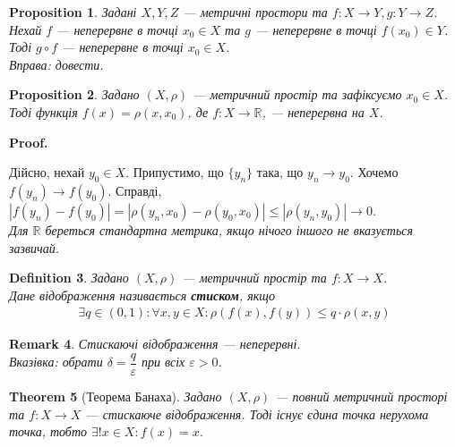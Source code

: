 \documentclass[a4paper, 10pt]{article}
\makeatletter
\theoremstyle{theoremdd}
\newtheorem{theorem}{Theorem}[subsection]
\theoremstyle{theoremdd}
\newtheorem{definition}[theorem]{Definition}
\theoremstyle{theoremdd}
\theoremstyle{theoremdd}
\theoremstyle{theoremdd}
\newtheorem{proposition}[theorem]{Proposition}
\theoremstyle{theoremdd}
\newtheorem{remark}[theorem]{Remark}
\theoremstyle{theoremdd}
\theoremstyle{theoremdd}
\renewenvironment{proof}[1][Proof.\\]{\par
\pushQED{\hfill \qed}%
\normalfont \topsep6\p@\@plus6\p@\relax
\trivlist
\item\relax
{\bfseries
#1\@addpunct{.}}\hspace\labelsep\ignorespaces
}{%
\popQED\endtrivlist\@endpefalse
}
\makeatother
\begin{document}
\begin{proposition}
Задані $X,Y,Z$ --- метричні простори та $f \colon X \to Y, g \colon Y \to Z$. Нехай $f$ --- неперервне в точці $x_0 \in X$ та $g$ --- неперервне в точці $f(x_0) \in Y$. Тоді $g \circ f$ --- неперервне в точці $x_0 \in X$.\\
\textit{Вправа: довести.}
\end{proposition}

\begin{proposition}
\label{continuity_of_metric_function_of_one_argument}
Задано $(X,\rho)$ --- метричний простір та зафіксуємо $x_0 \in X$. Тоді функція $f(x) = \rho(x,x_0)$, де $f \colon X \to \mathbb{R}$, --- неперервна на $X$.
\end{proposition}

\begin{proof}
Дійсно, нехай $y_0 \in X$. Припустимо, що $\{y_n\}$ така, що  $y_n \to y_0$. Хочемо $f(y_n) \to f(y_0)$. Справді,\\
$|f(y_n) - f(y_0)| = |\rho(y_n,x_0) - \rho(y_0,x_0)| \leq |\rho(y_n,y_0)| \to 0$.\\
\textit{Для $\mathbb{R}$ береться стандартна метрика, якщо нічого іншого не вказується зазвичай.}
\end{proof}

\begin{definition}
Задано $(X,\rho)$ --- метричний простір та $f \colon X \to X$.\\
Дане відображення називається \textbf{стиском}, якщо
\begin{align*}
\exists q \in (0,1): \forall x,y \in X: \rho(f(x),f(y)) \leq q \cdot \rho(x,y)
\end{align*}
\end{definition}

\begin{remark}
Стискаючі відображення --- неперервні.\\
\textit{Вказівка: обрати $\delta = \dfrac{q}{\varepsilon}$ при всіх $\varepsilon > 0$.}
\end{remark}

\begin{theorem}[Теорема Банаха]
Задано $(X,\rho)$ --- повний метричний просторі та $f \colon X \to X$ --- стискаюче відображення. Тоді існує єдина точка нерухома точка, тобто $\exists ! x \in X: f(x) = x$.
\end{theorem}
\end{document}
